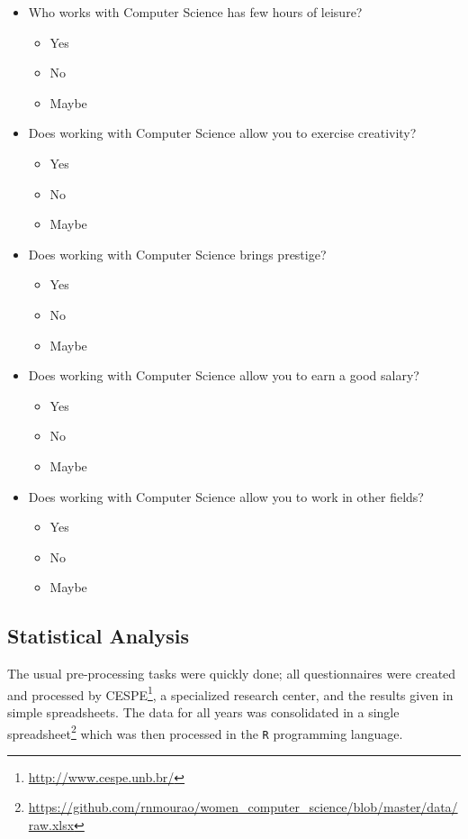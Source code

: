 \begin{itemize}
	\item Who works with Computer Science has few hours of leisure?
		\begin{itemize}
			\item Yes
			\item No
			\item Maybe
		\end{itemize}	
	\item Does working with Computer Science allow you to exercise creativity?
		\begin{itemize}
			\item Yes
			\item No
			\item Maybe
		\end{itemize}
	\item Does working with Computer Science brings prestige?
		\begin{itemize}
			\item Yes
			\item No
			\item Maybe
		\end{itemize}	
	\item Does working with Computer Science allow you to earn a good salary?
		\begin{itemize}
			\item Yes
			\item No
			\item Maybe
		\end{itemize}
	\item Does working with Computer Science allow you to work in other fields?
		\begin{itemize}
			\item Yes
			\item No
			\item Maybe
		\end{itemize}									
\end{itemize}


\subsection{Statistical Analysis}\label{sec:mining:stat}%
The usual pre-processing tasks were quickly done; all questionnaires were created and processed by CESPE\footnote{\url{http://www.cespe.unb.br/}}, a specialized research center, and the results given in simple spreadsheets. The data for all years was consolidated in a single spreadsheet\footnote{\url{https://github.com/rnmourao/women\_computer\_science/blob/master/data/raw.xlsx}}
which was then processed in the \texttt{R} programming language.

